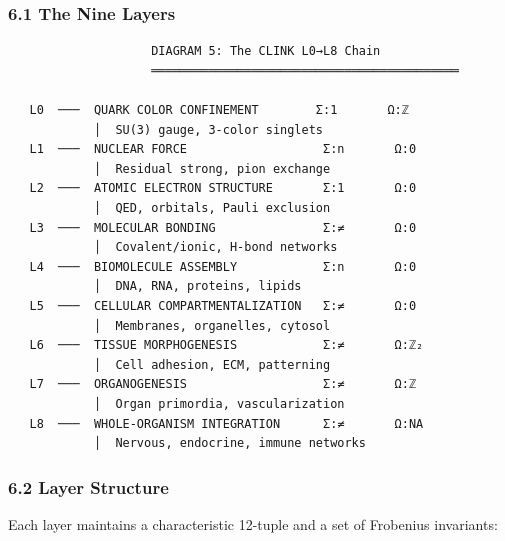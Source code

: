 \hypertarget{the-nine-layers}{%
\subsubsection{6.1 The Nine Layers}\label{the-nine-layers}}

\begin{verbatim}
                    DIAGRAM 5: The CLINK L0→L8 Chain
                    ═══════════════════════════════════════════

   L0  ───  QUARK COLOR CONFINEMENT        Σ:1       Ω:ℤ
            │  SU(3) gauge, 3-color singlets
   L1  ───  NUCLEAR FORCE                   Σ:n       Ω:0
            │  Residual strong, pion exchange
   L2  ───  ATOMIC ELECTRON STRUCTURE       Σ:1       Ω:0
            │  QED, orbitals, Pauli exclusion
   L3  ───  MOLECULAR BONDING               Σ:≠       Ω:0
            │  Covalent/ionic, H-bond networks
   L4  ───  BIOMOLECULE ASSEMBLY            Σ:n       Ω:0
            │  DNA, RNA, proteins, lipids
   L5  ───  CELLULAR COMPARTMENTALIZATION   Σ:≠       Ω:0
            │  Membranes, organelles, cytosol
   L6  ───  TISSUE MORPHOGENESIS            Σ:≠       Ω:ℤ₂
            │  Cell adhesion, ECM, patterning
   L7  ───  ORGANOGENESIS                   Σ:≠       Ω:ℤ
            │  Organ primordia, vascularization
   L8  ───  WHOLE-ORGANISM INTEGRATION      Σ:≠       Ω:NA
            │  Nervous, endocrine, immune networks
\end{verbatim}

\hypertarget{layer-structure}{%
\subsubsection{6.2 Layer Structure}\label{layer-structure}}

Each layer maintains a characteristic 12-tuple and a set of Frobenius
invariants:

